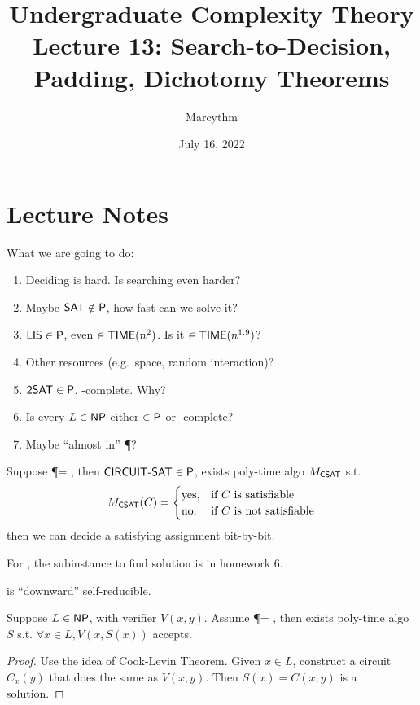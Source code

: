 \documentclass{article}
\title{Undergraduate Complexity Theory \\ Lecture 13: Search-to-Decision, Padding, Dichotomy Theorems}
\author{Marcythm}
\date{July 16, 2022}
\begin{document}
\maketitle{}

\section{Lecture Notes}

What we are going to do:
\begin{enumerate}
  \item Deciding  is hard. Is searching even harder?
  \item Maybe \(\prob{SAT} \notin \P\), how fast \ul{can} we solve it?
  \item \(\prob{LIS} \in \P\), even \(\in \TIME(n^2)\). Is it \(\in \TIME(n^{1.9})\)?
  \item Other resources (e.g.\ space, random interaction)?
  \item \(\prob{2SAT} \in \P\),  \NP-complete. Why?
  \item Is every \(L \in \NP\) either \(\in \P\) or \NP-complete?
  \item Maybe  ``almost in'' \P?
\end{enumerate}

Suppose \P = \NP, then \(\prob{CIRCUIT-SAT} \in \P\), exists poly-time algo \(M_{\prob{CSAT}}\) s.t.
\[ M_{\prob{CSAT}}(C) = \begin{cases}
  \mathrm{yes}, & \text{if \(C\) is satisfiable} \\
  \mathrm{no}, & \text{if \(C\) is not satisfiable}
\end{cases} \]
then we can decide a satisfying assignment bit-by-bit.

For , the subinstance to find solution is  in homework 6.

 is ``downward'' self-reducible.

\begin{theorem}
  Suppose \(L \in \NP\), with verifier \(V(x, y)\). Assume \P = \NP, then exists poly-time algo \(S\) s.t. \(\forall x \in L, V(x, S(x))\) accepts.
\end{theorem}

\begin{proof}
  Use the idea of Cook-Levin Theorem. Given \(x \in L\), construct a circuit \(C_x(y)\) that does the same as \(V(x, y)\).
  Then \(S(x) = C(x, y)\) is a solution.
\end{proof}
\end{document}
